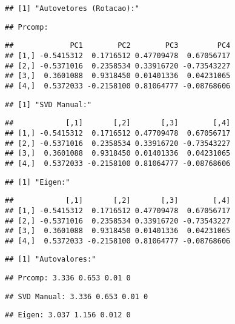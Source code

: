 \documentclass[
]{article}
\begin{document}
\begin{verbatim}
## [1] "Autovetores (Rotacao):"
\end{verbatim}

\begin{verbatim}
## Prcomp:
\end{verbatim}

\begin{verbatim}
##             PC1        PC2        PC3         PC4
## [1,] -0.5415312  0.1716512 0.47709478  0.67056717
## [2,] -0.5371016  0.2358534 0.33916720 -0.73543227
## [3,]  0.3601088  0.9318450 0.01401336  0.04231065
## [4,]  0.5372033 -0.2158100 0.81064777 -0.08768606
\end{verbatim}

\begin{verbatim}
## [1] "SVD Manual:"
\end{verbatim}

\begin{verbatim}
##            [,1]       [,2]       [,3]        [,4]
## [1,] -0.5415312  0.1716512 0.47709478  0.67056717
## [2,] -0.5371016  0.2358534 0.33916720 -0.73543227
## [3,]  0.3601088  0.9318450 0.01401336  0.04231065
## [4,]  0.5372033 -0.2158100 0.81064777 -0.08768606
\end{verbatim}

\begin{verbatim}
## [1] "Eigen:"
\end{verbatim}

\begin{verbatim}
##            [,1]       [,2]       [,3]        [,4]
## [1,] -0.5415312  0.1716512 0.47709478  0.67056717
## [2,] -0.5371016  0.2358534 0.33916720 -0.73543227
## [3,]  0.3601088  0.9318450 0.01401336  0.04231065
## [4,]  0.5372033 -0.2158100 0.81064777 -0.08768606
\end{verbatim}

\begin{verbatim}
## [1] "Autovalores:"
\end{verbatim}

\begin{verbatim}
## Prcomp: 3.336 0.653 0.01 0
\end{verbatim}

\begin{verbatim}
## SVD Manual: 3.336 0.653 0.01 0
\end{verbatim}

\begin{verbatim}
## Eigen: 3.037 1.156 0.012 0
\end{verbatim}
\end{document}
